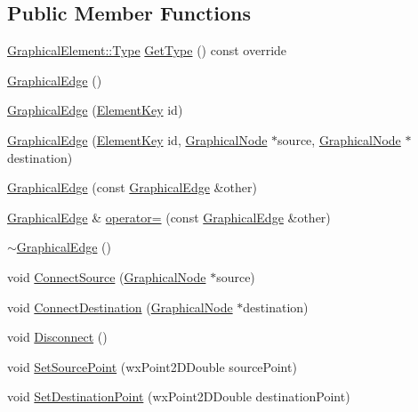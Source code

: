 \subsection*{Public Member Functions}
\begin{DoxyCompactItemize}
\item 
\hyperlink{class_graphical_element_aa485be48b901d85de97b3bd86f381d9e}{Graphical\+Element\+::\+Type} \hyperlink{class_graphical_edge_ad2db5ea6f28e2e572583909ff1f68088}{Get\+Type} () const override
\item 
\hyperlink{class_graphical_edge_a9325712366dcec2f70457f66b19bb04d}{Graphical\+Edge} ()
\item 
\hyperlink{class_graphical_edge_a5031d58d1096dbeef7f1c1c2e0cdb1f6}{Graphical\+Edge} (\hyperlink{_graphical_element_8h_ade5fd6c85839a416577ff9de1605141e}{Element\+Key} id)
\item 
\hyperlink{class_graphical_edge_af8c31162129b7c33427de769beaed38d}{Graphical\+Edge} (\hyperlink{_graphical_element_8h_ade5fd6c85839a416577ff9de1605141e}{Element\+Key} id, \hyperlink{class_graphical_node}{Graphical\+Node} $\ast$source, \hyperlink{class_graphical_node}{Graphical\+Node} $\ast$destination)
\item 
\hyperlink{class_graphical_edge_a50ac3c64f7c8d259d5905802a1808aa6}{Graphical\+Edge} (const \hyperlink{class_graphical_edge}{Graphical\+Edge} \&other)
\item 
\hyperlink{class_graphical_edge}{Graphical\+Edge} \& \hyperlink{class_graphical_edge_ad590b20ea1c1cb30a15850a36f82a2c9}{operator=} (const \hyperlink{class_graphical_edge}{Graphical\+Edge} \&other)
\item 
\hyperlink{class_graphical_edge_ac19b4561ff4274f8fbbc6700a86b2f27}{$\sim$\+Graphical\+Edge} ()
\item 
void \hyperlink{class_graphical_edge_a9f2e7f370705c390ad67f5b18ed80a00}{Connect\+Source} (\hyperlink{class_graphical_node}{Graphical\+Node} $\ast$source)
\item 
void \hyperlink{class_graphical_edge_a41868fd50c413744e61a549f1cef6a79}{Connect\+Destination} (\hyperlink{class_graphical_node}{Graphical\+Node} $\ast$destination)
\item 
void \hyperlink{class_graphical_edge_acc50ad4ea639802ce7d700d17f28f0e3}{Disconnect} ()
\item 
void \hyperlink{class_graphical_edge_a02acb6e42ac2d6def8a662006db2b1ff}{Set\+Source\+Point} (wx\+Point2\+D\+Double source\+Point)
\item 
void \hyperlink{class_graphical_edge_af6eedeeadcd9abc368b1c0725617f5c9}{Set\+Destination\+Point} (wx\+Point2\+D\+Double destination\+Point)

\end{DoxyCompactItemize}
